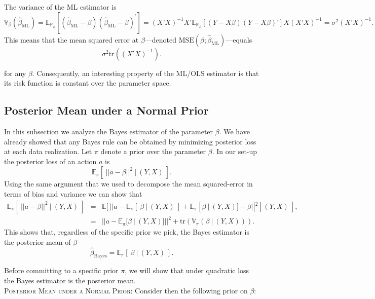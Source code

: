 \documentclass[11pt]{article} %
\begin{document}
The variance of the ML estimator is 
\begin{equation} \label{equation:variance}
\mathbb{V}_{\beta} (\widehat{\beta}_{\textrm{ML}}) = \mathbb{E}_{\mathbb{P}_{\beta}} [ (\widehat{\beta}_{\textrm{ML}}-\beta) (\widehat{\beta}_{\textrm{ML}} -\beta )^{\prime}  ]  = (X’X)^{-1} X’ \mathbb{E}_{\mathbb{P}_{\beta}} [ (Y-X\beta) (Y-X\beta)’] X (X’X)^{-1} = \sigma^2 (X’X)^{-1}.  
\end{equation}
This means that the mean squared error at $\beta$---denoted $\textrm{MSE}(\beta ; \widehat{\beta}_{\textrm{ML}})$---equals
\[ \sigma^2 \textrm{tr} \left ( (X’X)^{-1} \right). \] 

\noindent for any $\beta$. Consequently, an interesting property of the ML/OLS estimator is that its risk function is constant over the parameter space.  

\noindent 

\subsection{Posterior Mean under a Normal Prior}
In this subsection we analyze the Bayes estimator of the parameter $\beta$. We have already showed that any Bayes rule can be obtained by minimizing posterior loss at each data realization. Let $\pi$ denote a prior over the parameter $\beta$. In our set-up the posterior loss of an action $a$ is
\[ \mathbb{E}_{\pi} [ \: || a - \beta ||^2 \: | \: (Y,X) \: ]. \]
Using the same argument that we used to decompose the mean squared-error in terms of bias and variance we can show that
\begin{eqnarray*}
\mathbb{E}_{\pi} [ \: || a - \beta ||^2 \: | \: (Y,X) \: ] &=& \mathbb{E}[ \: || a - \mathbb{E}_{\pi} [ \: \beta \: | \:  (Y,X) \:  ] + \mathbb{E}_{\pi} [ \beta \: | \: (Y,X) ] -  \beta ||^2 \: | \: (Y,X) \: ],  \\
&=& || a - \mathbb{E}_{\pi} [ \beta \: | \: (Y,X) ] ||^2  + \textrm{tr} \left( \mathbb{V}_{\pi} ( \beta \: | \: (Y,X) ) \right). 
\end{eqnarray*}
This shows that, regardless of the specific prior we pick, the Bayes estimator is the posterior mean of $\beta$
\[ \widehat{\beta}_{\textrm{Bayes}} =   \mathbb{E}_{\pi} [ \: \beta \: | \: (Y,X) \: ].  \]

Before committing to a specific prior $\pi$, we will show that under quadratic loss the Bayes estimator is the posterior mean.\\  

{\scshape Posterior Mean under a Normal Prior:}  Consider then the following prior on $\beta$:
\end{document}
